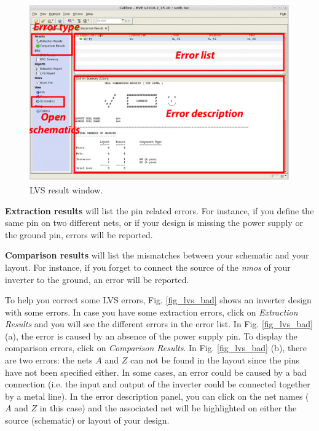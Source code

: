 \begin{itemize}	
\parbox[t]{\dimexpr\textwidth-\leftmargin}{%
	\begin{figure}
		\vspace{0mm}
		\centering
		\vspace{-\baselineskip}
	\includegraphics[scale=0.3]{figures/lab2_layout/lvs_verif}
\caption{LVS result window.}
\label{fig_lvsverif}
	\end{figure}
	\item \textbf{Extraction results} will list the pin related errors. For instance, if you define the same pin on two different nets, or if your design is missing the power supply or the ground pin, errors will be reported. 
	\item \textbf{Comparison results} will list the mismatches between your schematic and your layout. For instance, if you forget to connect the source of the \textit{nmos} of your inverter to the ground, an error will be reported.}
\end{itemize}


		\vspace{2mm}
To help you correct some LVS errors, Fig. \ref{fig_lvs_bad} shows an inverter design with some errors. In case you have some extraction errors, click on \textit{Extraction Results} and you will see the different errors in the error list. In Fig. \ref{fig_lvs_bad} (a), the error is caused by an absence of the power supply pin. To display the comparison errors, click on \textit{Comparison Results}. In Fig. \ref{fig_lvs_bad} (b), there are two errors: the nets $A$ and $Z$ can not be found in the layout since the pins have not been specified either. In some cases, an error could be caused by a bad connection (i.e. the input and output of the inverter could be connected together by a metal line). In the error description panel, you can click on the net names ($A$ and $Z$ in this case) and the associated net will be highlighted on either the source (schematic) or layout of your design. 


